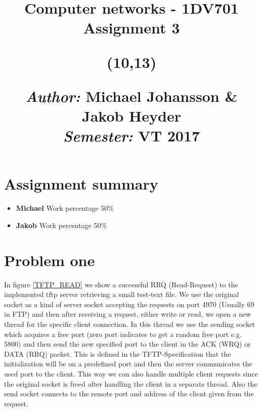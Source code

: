\documentclass[a4paper,12pt]{article}
\title{	
\vspace{-8cm}
\begin{sidebar}
    \vspace{10cm}
    \normalfont \normalsize
    \vspace{-1.3cm}
\end{sidebar}
\vspace{3cm}
\begin{flushleft}
    \huge Computer networks - 1DV701 \\ 
    \LARGE  Assignment 3\\
\end{flushleft}
\null
\vfill
\begin{textblock}{6}(10,13)
\begin{flushright}
\begin{minipage}{\textwidth}
\begin{flushleft} \large
\emph{Author:} Michael Johansson \& Jakob Heyder\\ %
\emph{Semester:} VT 2017\\ %
\end{flushleft}
\end{minipage}
\end{flushright}
\end{textblock}
}
\date{}
\numberwithin{figure}{section}
\begin{document}
\maketitle
\clearpage


\newpage
{}
\tableofcontents %
\newpage
{}

%
%

\section{Assignment summary}

\begin{itemize}
\item\textbf{Michael}
Work percentage 50\%

\item\textbf{Jakob} 
Work percentage 50\%
\end{itemize}



\newpage

\section{Problem one}

In figure \ref{TFTP_READ} we show a successful RRQ (Read-Request) to the implemented tftp server retrieving a small test-text file.
\newline \noindent
We use the original socket as a kind of server socket accepting the requests on port 4970 (Usually 69 in FTP) and then after receiving a request, either write or read, we open a new thread for the specific client connection. In this thread we use the sending socket which acquires a free port (zero port indicates to get a random free port e.g. 5800) and then send the new specified port to the client in the ACK (WRQ) or DATA (RRQ) packet.  This is defined in the TFTP-Specification that the initialization will be on a predefined port and then the server communicates the used port to the client. This way we can also handle multiple client requests since the original socket is freed after handling the client in a separate thread. Also the send socket connects to the remote port and address of the client given from the request.
\end{document}
